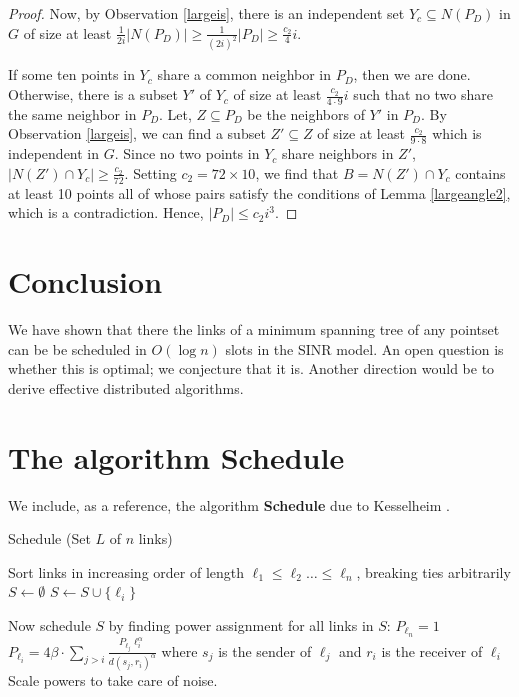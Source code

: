 \documentclass[11pt]{amsart}
\begin{document}
\begin{proof}
Now, by Observation \ref{largeis},
there is an independent set $Y_c \subseteq N(P_D)$ in $G$ of size at least
$\frac{1}{2i} |N(P_D)| \ge \frac{1}{(2i)^2} |P_D| \geq \frac{c_2}{4} i$.

If some ten points in $Y_c$ share a common neighbor in $P_D$, then we
are done. Otherwise, there is a subset $Y'$ of $Y_c$ of size at least 
$\frac{c_2}{4 \cdot 9} i$ such that no two share the same neighbor in $P_D$. 
Let, $Z \subseteq P_D$ be the neighbors of $Y'$ in $P_D$. By Observation \ref{largeis}, 
we can find a subset $Z' \subseteq Z$ of
size at least $\frac{c_2}{9 \cdot 8}$ which is independent in $G$.
Since no two points in $Y_c$ share neighbors in $Z'$, $|N(Z') \cap Y_c|
\geq \frac{c_2}{72}$. Setting $c_2 = 72 \times
10$, we find that $B = N(Z') \cap Y_c$ contains at least 10 points all of whose
pairs satisfy the conditions of Lemma \ref{largeangle2}, which is a contradiction.
Hence, $|P_D| \le c_2 i^3$.
\end{proof}



\section{Conclusion}

We have shown that there the links of a minimum spanning tree of any pointset can be be scheduled in $O(\log n)$ slots in the SINR model. An open question is whether this is optimal; we conjecture that it is.
Another direction would be to derive effective distributed algorithms.


		

\appendix


\section{The algorithm Schedule}
\label{app:a}
We include, as a reference, the algorithm \textbf{Schedule} due to Kesselheim \cite{KesselheimSoda11}.

\begin{algorithm}                      \caption{Schedule (Set $L$ of $n$ links)}          \label{alg2}                           \begin{algorithmic}[1]                    \STATE Sort links in increasing order of length $\ell_1 \leq \ell_2 \ldots \leq \ell_n$, breaking ties arbitrarily
     \STATE $S \gets \emptyset$
     \STATE $S \gets S \cup \{\ell_i\}$
      \ENDIF
     \ENDFOR

     \STATE Now schedule $S$ by finding power assignment for all links in $S$:
     \STATE $P_{\ell_n} = 1$
     \STATE $P_{\ell_i} = 4 \beta \cdot \sum_{j > i} \frac{P_{\ell_j} \ell_i^{\alpha}}{d(s_j, r_i)^{\alpha}}$ where $s_j$ is the sender of $\ell_j$ and $r_i$ is the receiver of $\ell_i$
     \ENDFOR
     \STATE Scale powers to take care of noise.
\end{algorithmic}
\label{alg2fig}
\end{algorithm}
\end{document}
